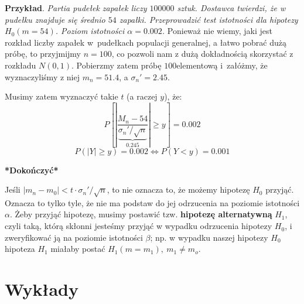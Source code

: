\documentclass[10pt,a4paper]{article}
\makeatletter
\newcounter{lecture}
\newcommand \listoflectures { \section*{Wykłady} \@starttoc{lol} }
\numberwithin{equation}{subsection}
\makeatother
\begin{document}
\textbf{Przykład}. \textit{Partia pudełek zapałek liczy $100000$ sztuk. Dostawca twierdzi, że w pudełku znajduje się średnio $54$ zapałki. Przeprowadzić
 test istotności dla hipotezy $H_0(m=54)$. Poziom istotności $\alpha=0.002$.} Ponieważ nie wiemy, jaki jest rozkład liczby zapałek w~pudełkach
populacji generalnej, a łatwo pobrać dużą próbę, to przyjmijmy $n=100$, co pozwoli nam z dużą dokładnością skorzystać z rozkładu $N(0,1)$. Pobierzmy zatem
 próbę $100$\dywiz elementową i~załóżmy, że wyznaczyliśmy z niej $m_n=51.4$, a ${\sigma_n}'=2.45$.

Musimy zatem wyznaczyć takie $t$ (a raczej $y$), że:
\[ P\left[ \left|\frac{M_n-54}{\underbrace{{\sigma_n}'/\sqrt{n}}_{0.245}}\right|\geq y \right] = 0.002 \]
\[ P(|Y|\geq y) = 0.002 \Longleftrightarrow P(Y<y)=0.001 \]
\begin{center}
 \textbf{*Dokończyć*}
\end{center}
Jeśli $|m_n-m_0|<t\cdot{\sigma_n}'/\sqrt{n}$, to nie oznacza to, że możemy hipotezę $H_0$ przyjąć. Oznacza to tylko tyle, że nie ma podstaw do jej
odrzucenia na poziomie istotności $\alpha$. Żeby przyjąć hipotezę, musimy postawić tzw. \textbf{hipotezę alternatywną} $H_1$, czyli taką, którą
skłonni jesteśmy przyjąć w wypadku odrzucenia hipotezy $H_0$, i zweryfikować ją na poziomie istotności $\beta$; np. w wypadku naszej hipotezy $H_0$
hipoteza $H_1$ miałaby postać $H_1(m=m_1),~m_1 \neq m_o$.
\listoflectures
\end{document}
